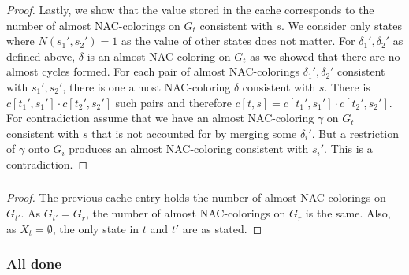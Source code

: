 \begin{proof}
	Lastly, we show that the value stored in the cache corresponds
	to the number of almost NAC-colorings on \( G_t \) consistent with \( s \).
	We consider only states where \( N(s_1', s_2') = 1 \)
	as the value of other states does not matter.
	For \( \delta_1', \delta_2' \) as defined above, \( \delta \) is an almost NAC-coloring
	on \( G_t \) as we showed that there are no almost cycles formed.
	For each pair of almost NAC-colorings \( \delta_1', \delta_2' \) consistent with \( s_1', s_2' \),
	there is one almost NAC-coloring \( \delta \) consistent with \( s \).
	There is \( c[t_1', s_1'] \cdot c[t_2', s_2'] \) such pairs and therefore
	\( c[t, s] = c[t_1', s_1'] \cdot c[t_2', s_2'] \).
	For contradiction assume that we have
	an almost NAC-coloring \( \gamma \) on \( G_t \) consistent with \( s \)
	that is not accounted for by merging some \( \delta_i' \).
	But a restriction of \( \gamma \) onto \( G_i \) produces an almost NAC-coloring
	consistent with \( s_i' \). This is a contradiction.
\end{proof}
%

\subsubsection*{\RootNode{}}

%
%
\begin{proof}
	The previous cache entry holds the number of almost NAC-colorings on \( G_{t'} \).
	As \( G_{t'} = G_r \), the number of almost NAC-colorings on \( G_r \) is the same.
	Also, as \( X_t = \emptyset \), the only state in \( t \) and \( t' \) are as stated.
\end{proof}
%

\subsubsection*{All done}

